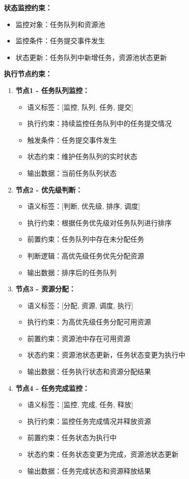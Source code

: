 \documentclass[fontset=windows]{article}
\begin{document}
\textbf{状态监控约束：}
\begin{itemize}
    \item 监控对象：任务队列和资源池
    \item 监控条件：任务提交事件发生
    \item 状态更新：任务队列中新增任务，资源池状态更新
\end{itemize}

\textbf{执行节点约束：}
\begin{enumerate}
    \item \textbf{节点1 - 任务队列监控：}
    \begin{itemize}
        \item 语义标签：[监控, 队列, 任务, 提交]
        \item 执行约束：持续监控任务队列中的任务提交情况
        \item 触发条件：任务提交事件发生
        \item 状态约束：维护任务队列的实时状态
        \item 输出数据：当前任务队列状态
    \end{itemize}

    \item \textbf{节点2 - 优先级判断：}
    \begin{itemize}
        \item 语义标签：[判断, 优先级, 排序, 调度]
        \item 执行约束：根据任务优先级对任务队列进行排序
        \item 前置约束：任务队列中存在未分配任务
        \item 判断逻辑：高优先级任务优先分配资源
        \item 输出数据：排序后的任务队列
    \end{itemize}

    \item \textbf{节点3 - 资源分配：}
    \begin{itemize}
        \item 语义标签：[分配, 资源, 调度, 执行]
        \item 执行约束：为高优先级任务分配可用资源
        \item 前置约束：资源池中存在可用资源
        \item 状态约束：资源池状态更新，任务状态变更为执行中
        \item 输出数据：任务执行状态和资源分配结果
    \end{itemize}

    \item \textbf{节点4 - 任务完成监控：}
    \begin{itemize}
        \item 语义标签：[监控, 完成, 任务, 释放]
        \item 执行约束：监控任务完成情况并释放资源
        \item 前置约束：任务状态为执行中
        \item 状态约束：任务状态变更为完成，资源池状态更新
        \item 输出数据：任务完成状态和资源释放结果
    \end{itemize}
\end{enumerate}
\end{document}
